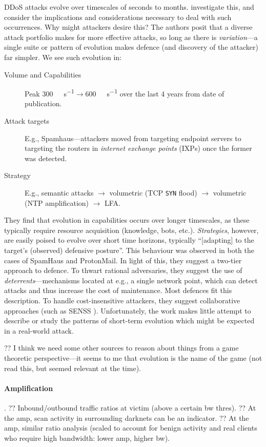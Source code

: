 DDoS attacks evolve over timescales of seconds to months.
\Textcite{DBLP:conf/spw/KangGS16} investigate this, and consider the implications and considerations necessary to deal with such occurrences.
Why might attackers desire this?
The authors posit that a diverse attack portfolio makes for more effective attacks, so long as there is \emph{variation}---a single suite or pattern of evolution makes defence (and discovery of the attacker) far simpler.
We see such evolution in:
\begin{description}
	\item[Volume and Capabilities] Peak \SI{300}{\gibi\bit\per\second}$\rightarrow$\SI{600}{\gibi\bit\per\second} over the last 4 years from date of publication.
	\item[Attack targets] E.g., Spamhaus---attackers moved from targeting endpoint servers to targeting the routers in \emph{internet exchange points} (IXPs) once the former was detected.
	\item[Strategy] E.g., semantic attacks $\rightarrow$ volumetric (TCP \texttt{SYN} flood) $\rightarrow$ volumetric (NTP amplification) $\rightarrow$ LFA.
\end{description}
They find that evolution in capabilities occurs over longer timescales, as these typically require resource acquisition (knowledge, bots, etc.).
\emph{Strategies}, however, are easily poised to evolve over short time horizons, typically ``[adapting] to the target's (observed) defensive posture''.
This behaviour was observed in both the cases of SpamHaus and ProtonMail.
In light of this, they suggest a two-tier approach to defence.
To thwart rational adversaries, they suggest the use of \emph{deterrents}---mechanisms located at e.g., a single network point, which can detect attacks and thus increase the cost of maintenance.
Most defences fit this description.
To handle cost-insensitive attackers, they suggest collaborative approaches (such as SENSS \cite{DBLP:conf/acsac/RamanathanMYZ18}).
Unfortunately, the work makes little attempt to describe or study the patterns of short-term evolution which might be expected in a real-world attack.

?? I think we need some other sources to reason about things from a game theoretic perspective---it seems to me that evolution is the name of the game \cite{DBLP:conf/atal/SinhaKT16} (not read this, but seemed relevant at the time).

\paragraph{Amplification}
\textcite{DBLP:conf/ndss/Rossow14}.
?? Inbound/outbound traffic ratios at victim (above a certain bw thres).
?? At the amp, scan activity in surrounding darknets can be an indicator.
?? At the amp, similar ratio analysis (scaled to account for benign activity and real clients who require high bandwidth: lower amp, higher bw).


